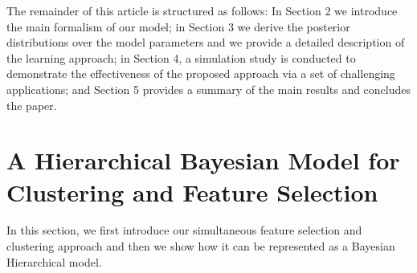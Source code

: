 \documentclass[journal,10pt]{elsart}
\begin{document}
The remainder of this article is structured as follows: In Section 2 we introduce the main formalism of our model; in Section 3 we derive the posterior distributions over the model parameters and we provide a detailed description of the learning approach; in Section 4, a simulation study is conducted to demonstrate the effectiveness of the proposed approach via a set of challenging applications; and Section 5 provides a summary of the main results and concludes the paper.
\section{A Hierarchical Bayesian Model for Clustering and Feature Selection}
In this section, we first introduce our simultaneous feature selection and clustering approach and then we show how it can be represented as a Bayesian Hierarchical model.
\end{document}
